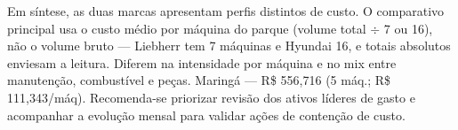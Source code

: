 Em síntese, as duas marcas apresentam perfis distintos de custo. O comparativo principal usa o custo médio por máquina do parque (volume total $\div$ 7 ou 16), não o volume bruto --- Liebherr tem 7 máquinas e Hyundai 16, e totais absolutos enviesam a leitura. Diferem na intensidade por máquina e no mix entre manutenção, combustível e peças. Maringá — R\$ 556,716 (5 máq.; R\$ 111,343/máq). Recomenda-se priorizar revisão dos ativos líderes de gasto e acompanhar a evolução mensal para validar ações de contenção de custo.
